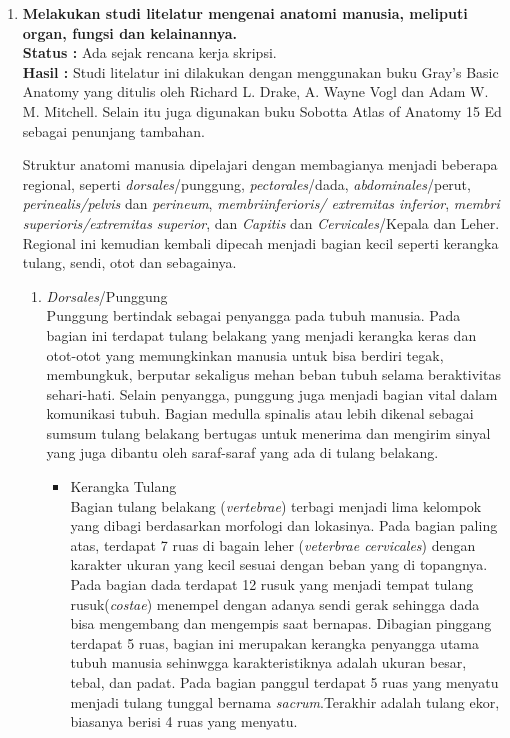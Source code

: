 \documentclass[a4paper,twoside]{article}
\begin{document}
    	\begin{enumerate}
		      \item {\bf Melakukan studi litelatur mengenai anatomi manusia, meliputi organ, fungsi dan kelainannya.} \\
            {\bf Status :} Ada sejak rencana kerja skripsi.\\
    		{\bf Hasil  :} Studi litelatur ini dilakukan dengan menggunakan buku Gray's Basic Anatomy yang ditulis oleh Richard L. Drake, A. Wayne Vogl dan Adam W. M. Mitchell. Selain itu juga digunakan buku Sobotta Atlas of Anatomy 15 Ed sebagai penunjang tambahan.
            
            Struktur anatomi manusia dipelajari dengan membagianya menjadi beberapa regional, seperti \textit{dorsales}/punggung, \textit{pectorales}/dada, \textit{abdominales}/perut, \textit{perinealis/pelvis} dan \textit{perineum}, \textit{membriinferioris/ extremitas inferior}, \textit{membri superioris/extremitas superior}, dan \textit{Capitis} dan \textit{Cervicales}/Kepala dan Leher. Regional ini kemudian kembali dipecah menjadi bagian kecil seperti kerangka tulang, sendi, otot dan sebagainya. 
            \begin{enumerate}
                \item \textit{Dorsales}/Punggung\\
                Punggung bertindak sebagai penyangga pada tubuh manusia. Pada bagian ini terdapat tulang belakang yang menjadi kerangka keras dan otot-otot yang memungkinkan manusia untuk bisa berdiri tegak, membungkuk, berputar sekaligus mehan beban tubuh selama beraktivitas sehari-hati. Selain penyangga, punggung juga menjadi bagian vital dalam komunikasi tubuh. Bagian medulla spinalis atau lebih dikenal sebagai sumsum tulang belakang bertugas untuk menerima dan mengirim sinyal yang juga dibantu oleh saraf-saraf yang ada di tulang belakang. 
                \begin{itemize}
                    \item Kerangka Tulang\\
                    Bagian tulang belakang (\textit{vertebrae}) terbagi menjadi lima kelompok yang dibagi berdasarkan morfologi dan lokasinya. Pada bagian paling atas, terdapat 7 ruas di bagain leher (\textit{veterbrae cervicales}) dengan karakter ukuran yang kecil sesuai dengan beban yang di topangnya. Pada bagian dada terdapat 12 rusuk yang menjadi tempat tulang rusuk(\textit{costae}) menempel dengan adanya sendi gerak sehingga dada bisa mengembang dan mengempis saat bernapas. Dibagian pinggang terdapat 5 ruas, bagian ini merupakan kerangka penyangga utama tubuh manusia sehinwgga karakteristiknya adalah ukuran besar, tebal, dan padat. Pada bagian panggul terdapat 5 ruas yang menyatu menjadi tulang tunggal bernama \textit{sacrum}.Terakhir adalah tulang ekor, biasanya berisi 4 ruas yang menyatu. 


\end{itemize}
\end{enumerate}
\end{enumerate}
\end{document}
